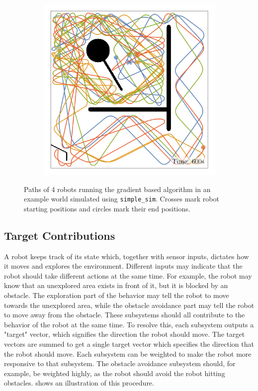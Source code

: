 \begin{figure}[H]
\begin{subfigure}[b]{\w}
    \end{subfigure}
    \begin{subfigure}[b]{\w}
        \centering
        \includegraphics[width=\textwidth]{./figures/plots/paths/avoid-obstacles-paths-(after-600s).png}
    \end{subfigure}
    \caption{Paths of 4 robots running the gradient based algorithm in an example world simulated using \texttt{simple\_sim}. Crosses mark robot starting positions and circles mark their end positions.}
    \label{fig:roomba-paths}
\end{figure}

\subsection{Target Contributions}
A robot keeps track of its state which, together with sensor inputs, dictates how it moves and explores the environment. Different inputs may indicate that the robot should take different actions at the same time. For example, the robot may {\color{red} know} that an unexplored area exists in front of it, but it is blocked by an obstacle. The exploration part of the behavior may tell the robot to move towards the unexplored area, while the obstacle avoidance part may {\color{red} tell} the robot to move away from the obstacle. These subsystems should all contribute to the behavior of the robot at the same time. To resolve this, each subsystem outputs a "target" vector, which signifies the direction the robot should move. The target vectors are summed to get a single target vector which specifies the direction that the robot should move. Each subsystem can be weighted to make the robot more responsive to that subsystem. The obstacle avoidance subsystem should, for example, be weighted highly, as the robot should avoid the robot hitting obstacles.  shows an illustration of this procedure.

